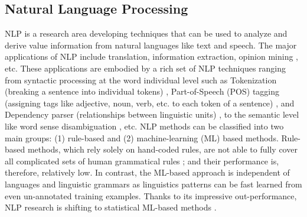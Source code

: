 \documentclass[Journal, BackFigs, DoubleSpace]{ascelike} %
\begin{document}
\subsection{Natural Language Processing}
NLP is a research area developing techniques that can be used to analyze and derive value information from natural languages like text and speech. The major applications of NLP include translation, information extraction, opinion mining \cite{Cambria14}, etc. These applications are embodied by a rich set of NLP techniques ranging from syntactic  processing at the word individual level such as Tokenization (breaking a sentence into individual tokens) \cite{Webster92,Zhao11},  Part-of-Speech (POS) tagging (assigning tags like adjective, noun, verb, etc. to each token of a sentence) \cite{Toutanova03,Cunningham02}, and Dependency parser (relationships between linguistic units) \cite{chen14},  to the semantic level like word sense disambiguation \cite{Lesk86,Yarowsky95,Navigli09}, etc. NLP methods can be classified into two main groups: (1) rule-based and (2) machine-learning (ML) based methods. Rule-based methods, which rely solely on hand-coded rules, are not able to fully cover all complicated sets of human grammatical rules \cite{Marcus95}; and their performance is, therefore, relatively low. In contrast, the ML-based approach is independent of languages and linguistic grammars \cite{costa-jussa12} as linguistics patterns can be fast learned from even un-annotated training examples. Thanks to its impressive out-performance, NLP research is shifting to statistical ML-based methods \cite{Cambria14}. 
%
\end{document}
